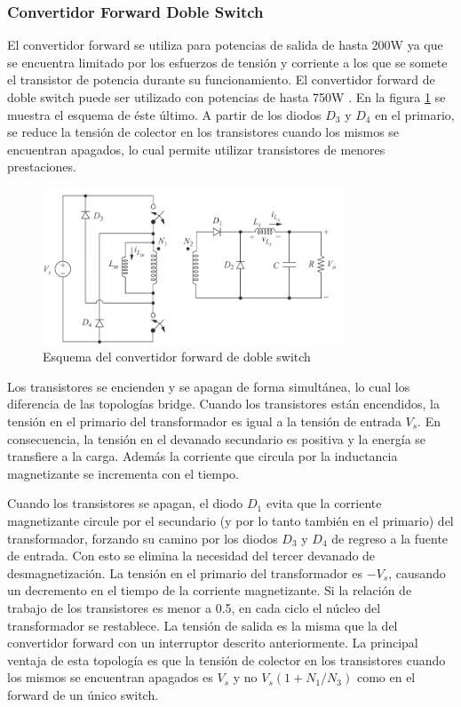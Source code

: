 \subsubsection{Convertidor Forward Doble Switch}

El convertidor forward se utiliza para potencias de salida de hasta 200W ya que se encuentra limitado 
por los esfuerzos de tensión y corriente a los que se somete el transistor de potencia durante su funcionamiento. 
El convertidor forward de doble switch puede ser utilizado con potencias de hasta 750W \cite{mohan}.
En la figura \ref{fig:forward_doble_switch} se muestra el esquema de éste último.
A partir de los diodos $D_3$ y $D_4$ en el primario, se reduce la tensión de colector en los transistores cuando los mismos 
se encuentran apagados, lo cual permite utilizar transistores de menores prestaciones.

\begin{figure}[ht]
    \centering
    \includegraphics[width=0.8\textwidth]{../images/hart/forward_doble_switch.png}
    \caption{Esquema del convertidor forward de doble switch}
    \label{fig:forward_doble_switch}
\end{figure}

Los transistores se encienden y se apagan de forma simultánea, lo cual los diferencia de las topologías bridge. 
Cuando los transistores están encendidos, la tensión en el primario del transformador es igual a la tensión de entrada $V_s$. 
En consecuencia, la tensión en el devanado secundario es positiva y la energía se transfiere a la carga. 
Además la corriente que circula por la inductancia magnetizante se incrementa con el tiempo. 

Cuando los transistores se apagan, el diodo $D_1$ evita que la corriente magnetizante circule por el secundario 
(y por lo tanto también en el primario) del transformador, forzando su camino por los diodos $D_3$ y $D_4$ de regreso a la fuente de entrada.  
Con esto se elimina la necesidad del tercer devanado de desmagnetización. 
La tensión en el primario del transformador es $-V_s$, causando un decremento en el tiempo de la corriente magnetizante. 
Si la relación de trabajo de los transistores es menor a 0.5, en cada ciclo el núcleo del transformador se restablece.
La tensión de salida es la misma que la del convertidor forward con un interruptor descrito anteriormente.
La principal ventaja de esta topología es que la tensión de colector en los transistores cuando los mismos se encuentran apagados 
es $V_s$ y no $V_s\left(1+N_1/N_3\right)$ como en el forward de un único switch.

